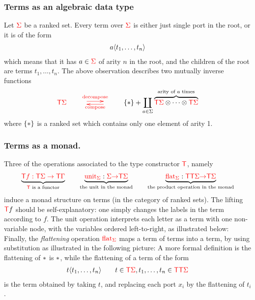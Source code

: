 \subsubsection{Terms as an algebraic data type} Let ${\color{red}{\Sigma}}$ be a ranked set. Every term over  ${\color{red}{\Sigma}}$ is either just single port in the root, or it is of the form
\begin{align*}
    a \langle{t_1,\ldots,t_n}\rangle
\end{align*}
which means that it has  $a \in {\color{red}{\Sigma}}$ of arity $n$ in the root, and the children of the root are  terms $t_1,\ldots,t_n$. The above observation describes two mutually inverse functions 
\begin{align*}
    \tmonad \rSigma  \qquad \ranked{\xymatrix{
        \ar@<.5ex>[r]^{\decomposeterm}&  \ar@<.5ex>[l]^{\composeterm} 
    }} \qquad 
    \set * + \coprod_{a \in \Sigma} \overbrace{\tmonad \rSigma \otimes \cdots \otimes \tmonad \rSigma}^{\text{arity of $a$ times}}
\end{align*}
where $\{*\}$ is a ranked set which contains only one element of arity 1. 

\subsubsection{Terms as a monad.} Three of the operations associated to the type constructor ${\color{red}{\mathsf T}}$, namely  
\begin{align*}
        \underbrace{{\color{red}{{\color{red}{\mathsf T}}f : {\color{red}{\mathsf T}}\Sigma \to {\color{red}{\mathsf T}}\Gamma}}}_{\text{${\color{red}{\mathsf T}}$ is a functor}} \qquad  \underbrace{{\color{red}{\mathrm{unit}}}_{\color{red}{\Sigma}} : {\color{red}{\Sigma}} {\color{red}{\to}} {\color{red}{\mathsf T}} {\color{red}{\Sigma}}}_{\text{the unit in the monad}} \qquad  \underbrace{{\color{red}{\mathrm{flat}}}_{\color{red}{\Sigma}} : {\color{red}{\mathsf T}} {\color{red}{\mathsf T}} {\color{red}{\Sigma}} {\color{red}{\to}} {\color{red}{\mathsf T}} {\color{red}{\Sigma}}}_{\text{the product operation in the monad}}
\end{align*}
induce a monad structure on terms (in the category of ranked sets). The lifting ${\color{red}{\mathsf T}} f$ should be self-explanatory: one simply changes the labels in the term according to $f$. The  unit operation interprets each letter as a term with one non-variable node, with the variables ordered left-to-right,  as illustrated below:
Finally, the  \emph{flattening} operation ${\color{red}{\mathrm{flat}}}_{\color{red}{\Sigma}}$ 
        maps a term of terms into a term, by using substitution as illustrated in the following picture:  
A more formal definition is the flattening of $*$ is $*$, while the flattening of a term of the form 
\begin{align*}
    t \langle{t_1,\ldots,t_n}\rangle \qquad t \in {\color{red}{\mathsf T}} {\color{red}{\Sigma}}, t_1,\ldots,t_n \in {\color{red}{\mathsf T}} {\color{red}{\mathsf T}} {\color{red}{\Sigma}}    
\end{align*}
 is the term obtained by taking $t$, and replacing each port $x_i$ by the flattening of $t_i$.
    
